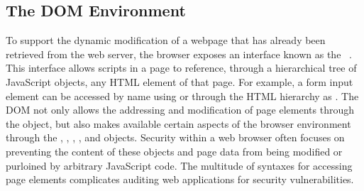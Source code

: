 \subsection{The DOM Environment}\label{sec:dom}
To support the dynamic modification of a webpage that has already been retrieved from the web server, the browser exposes an interface known as the ~\cite{dom}.
This interface allows scripts in a page to reference, through a hierarchical tree of JavaScript objects, any HTML element of that page.
For example, a form input element can be accessed by name using  or through the HTML hierarchy as .
The DOM not only allows the addressing and modification of page elements through the  object, but also makes available certain aspects of the browser environment through the , , , , and  objects.
Security within a web browser often focuses on preventing the content of these objects and page data from being modified or purloined by arbitrary JavaScript code.
The multitude of syntaxes for accessing page elements complicates auditing web applications for security vulnerabilities.

